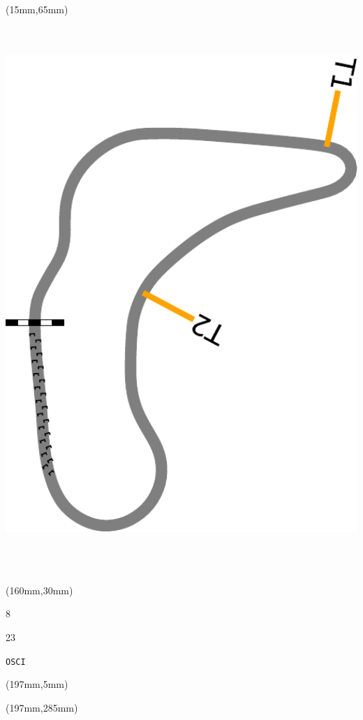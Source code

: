 \begin{textblock*}{185mm}(15mm,65mm)%
\centering
\mbox{\includegraphics[width=185mm,height=210mm,keepaspectratio]{PT/OSCI.pdf}}
\end{textblock*}
\begin{textblock*}{40mm}(160mm,30mm)%
\Large
\par{} 
\par8 
\par23 
\par\hfill\tiny\tt OSCI\\
\end{textblock*}
\begin{textblock*}{20mm}(197mm,5mm)%
\fbox{\thepage}
\label{OSCI}
\end{textblock*}
\begin{textblock*}{20mm}(197mm,285mm)%
\fbox{\thepage}
\end{textblock*}

